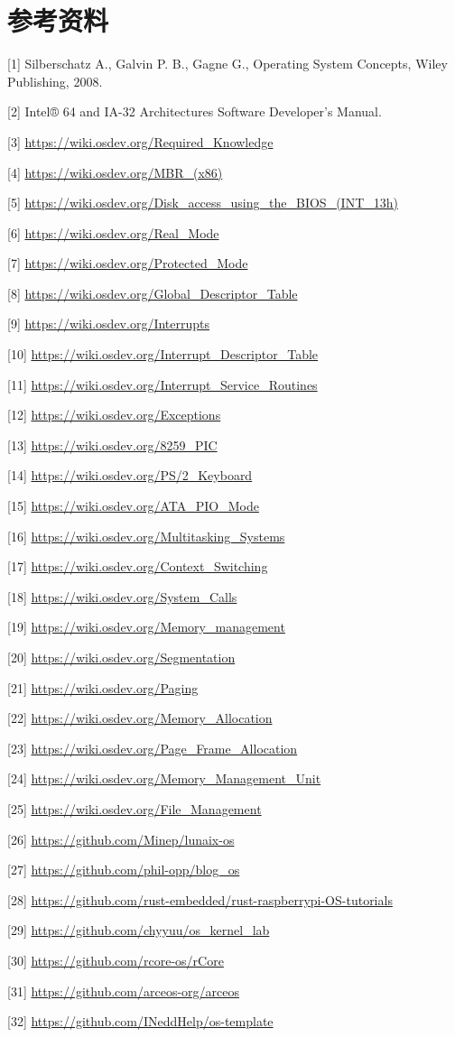 \section*{参考资料}

[1] Silberschatz A., Galvin P. B., Gagne G., Operating System Concepts, Wiley Publishing, 2008.

[2] Intel® 64 and IA-32 Architectures Software Developer's Manual.

[3] \url{https://wiki.osdev.org/Required\_Knowledge}

[4] \url{https://wiki.osdev.org/MBR\_(x86)}

[5] \url{https://wiki.osdev.org/Disk\_access\_using\_the\_BIOS\_(INT\_13h)}

[6] \url{https://wiki.osdev.org/Real\_Mode}

[7] \url{https://wiki.osdev.org/Protected\_Mode}

[8] \url{https://wiki.osdev.org/Global\_Descriptor\_Table}

[9] \url{https://wiki.osdev.org/Interrupts}

[10] \url{https://wiki.osdev.org/Interrupt\_Descriptor\_Table}

[11] \url{https://wiki.osdev.org/Interrupt\_Service\_Routines}

[12] \url{https://wiki.osdev.org/Exceptions}

[13] \url{https://wiki.osdev.org/8259\_PIC}

[14] \url{https://wiki.osdev.org/PS/2\_Keyboard}

[15] \url{https://wiki.osdev.org/ATA\_PIO\_Mode}

[16] \url{https://wiki.osdev.org/Multitasking\_Systems}

[17] \url{https://wiki.osdev.org/Context\_Switching}

[18] \url{https://wiki.osdev.org/System\_Calls}

[19] \url{https://wiki.osdev.org/Memory\_management}

[20] \url{https://wiki.osdev.org/Segmentation}

[21] \url{https://wiki.osdev.org/Paging}

[22] \url{https://wiki.osdev.org/Memory\_Allocation}

[23] \url{https://wiki.osdev.org/Page\_Frame\_Allocation}

[24] \url{https://wiki.osdev.org/Memory\_Management\_Unit}

[25] \url{https://wiki.osdev.org/File\_Management}

[26] \url{https://github.com/Minep/lunaix-os}

[27] \url{https://github.com/phil-opp/blog\_os}

[28] \url{https://github.com/rust-embedded/rust-raspberrypi-OS-tutorials}

[29] \url{https://github.com/chyyuu/os\_kernel\_lab}

[30] \url{https://github.com/rcore-os/rCore}

[31] \url{https://github.com/arceos-org/arceos}

[32] \url{https://github.com/INeddHelp/os-template}